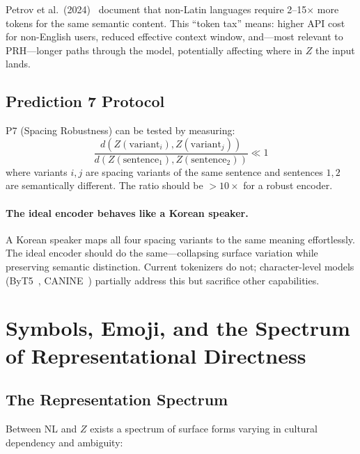 \documentclass[11pt]{article}
\theoremstyle{definition}
\begin{document}
Petrov et al.\ (2024)~\cite{petrov2024tokenizers} document that non-Latin languages require 2--15$\times$ more tokens for the same semantic content. This ``token tax'' means: higher API cost for non-English users, reduced effective context window, and---most relevant to PRH---longer paths through the model, potentially affecting where in $Z$ the input lands.

\subsection{Prediction 7 Protocol}

P7 (Spacing Robustness) can be tested by measuring:
\[
\frac{d(Z(\text{variant}_i), Z(\text{variant}_j))}{d(Z(\text{sentence}_1), Z(\text{sentence}_2))} \ll 1
\]
where variants $i,j$ are spacing variants of the same sentence and sentences $1,2$ are semantically different. The ratio should be $> 10\times$ for a robust encoder.

\paragraph{The ideal encoder behaves like a Korean speaker.}
A Korean speaker maps all four spacing variants to the same meaning effortlessly. The ideal encoder should do the same---collapsing surface variation while preserving semantic distinction. Current tokenizers do not; character-level models (ByT5~\cite{xue2022byt5}, CANINE~\cite{clark2022canine}) partially address this but sacrifice other capabilities.

\section{Symbols, Emoji, and the Spectrum of Representational Directness}\label{app:emoji}

\subsection{The Representation Spectrum}

Between NL and $Z$ exists a spectrum of surface forms varying in cultural dependency and ambiguity:
\end{document}
